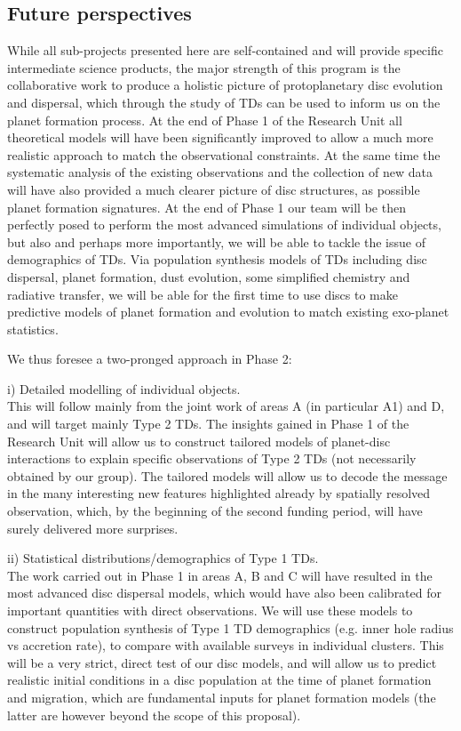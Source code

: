 \documentclass[10pt,fleqn,twoside]{article}
\begin{document}
\subsection{Future perspectives}
%
While all sub-projects presented here are self-contained and will
provide specific intermediate science products, the major strength of this program is the collaborative
work to produce a holistic picture of protoplanetary disc evolution
and dispersal, which through the study of TDs can be used
to inform us on the planet formation process. At the end of Phase 1 of
the Research Unit all theoretical models will have been significantly
improved to allow a much more realistic approach to match the
observational constraints. At the same time the systematic analysis of
the existing observations and the collection of new data will have also
provided a much clearer picture of disc structures, as possible planet
formation signatures. At the end of Phase 1 our team will be then
perfectly posed to perform the most advanced simulations of individual
objects, but also and perhaps more importantly, we will be able to
tackle the issue of demographics of TDs. Via population
synthesis models of TDs including disc dispersal, planet formation, dust
evolution, some simplified chemistry and radiative transfer, we will
be able for the first time to use discs to make predictive models of
planet formation and evolution to match existing exo-planet
statistics. 

We thus foresee a two-pronged approach in Phase 2: 

i) Detailed modelling of individual objects.\\
This will follow mainly from the joint work of areas A (in particular
A1) and D, and will target mainly Type 2 TDs. The insights gained in
Phase 1 of the Research Unit will allow us to construct tailored
models of planet-disc interactions to explain specific observations of
Type 2 TDs (not necessarily obtained by our group). The tailored
models will allow us to decode the message in the many interesting new
features highlighted already by spatially resolved observation, which,
by the beginning of the second funding period, will have surely
delivered more surprises.  

ii) Statistical distributions/demographics of Type 1 TDs. \\
The work carried out in Phase 1 in areas A, B and C will have resulted
in the most advanced disc dispersal models, which would have also been
calibrated for important quantities with direct observations. We will
use these models to construct population synthesis of Type 1
TD demographics (e.g. inner hole radius vs accretion
rate), to compare with available surveys in individual clusters.  
This will be a very strict, direct test of our disc models, and will
allow us to predict realistic initial conditions in a disc population at the
time of planet formation and migration, which are fundamental inputs
for planet formation models (the latter are however beyond the scope of this
proposal).  
\end{document}
